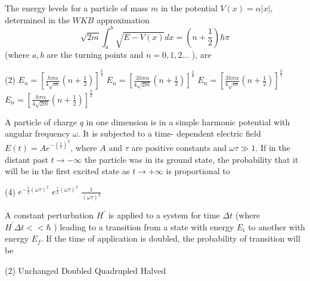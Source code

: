 \begin{enumerate}
\begin{minipage}{\textwidth}
	\item The energy levels for a particle of mass $m$ in the potential $V(x)=\alpha|x|$, determined in the $W K B$ approximation
	$$
	\sqrt{2 m} \int_{a}^{b} \sqrt{E-V(x)} d x=\left(n+\frac{1}{2}\right) \hbar \pi
	$$
	(where $a, b$ are the turning points and $n=0,1,2 \ldots$ ), are
\end{minipage}
\begin{tasks}(2)
	\task[\textbf{A.}] $E_{n}=\left[\frac{h \pi \alpha}{4 \sqrt{m}}\left(n+\frac{1}{2}\right)\right]^{\frac{2}{3}}$
	\task[\textbf{B.}]$E_{n}=\left[\frac{3 h \pi \alpha}{4 \sqrt{2 m}}\left(n+\frac{1}{2}\right)\right]^{\frac{2}{3}}$
	\task[\textbf{C.}]$E_{n}=\left[\frac{3 h \pi \alpha}{4 \sqrt{m}}\left(n+\frac{1}{2}\right)\right]^{\frac{2}{3}}$
	\task[\textbf{D.}] $E_{n}=\left[\frac{h \pi \alpha}{4 \sqrt{2 m}}\left(n+\frac{1}{2}\right)\right]^{\frac{2}{3}}$
\end{tasks}
\begin{minipage}{\textwidth}
	\item A particle of charge $q$ in one dimension is in a simple harmonic potential with angular frequency $\omega$. It is subjected to a time- dependent electric field $E(t)=A e^{-\left(\frac{t}{\tau}\right)^{2}}$, where $A$ and $\tau$ are positive constants and $\omega \tau \gg 1$. If in the distant past $t \rightarrow-\infty$ the particle was in its ground state, the probability that it will be in the first excited state as $t \rightarrow+\infty$ is proportional to
\end{minipage}
\begin{tasks}(4)
	\task[\textbf{A.}] $e^{-\frac{1}{2}(\omega \tau)^{2}}$
	\task[\textbf{B.}]$e^{\frac{1}{2}(\omega \tau)^{2}}$
	\task[\textbf{D.}]$\frac{1}{(\omega \tau)^{2}}$
\end{tasks}
\begin{minipage}{\textwidth}
	\item A constant perturbation $H^{\prime}$ is applied to a system for time $\Delta t$ (where $H^{\prime} \Delta t<<\hbar$ ) leading to a transition from a state with energy $E_{i}$ to another with energy $E_{f}$. If the time of application is doubled, the probability of transition will be
\end{minipage}
\begin{tasks}(2)
	\task[\textbf{A.}] Unchanged
	\task[\textbf{B.}]Doubled
	\task[\textbf{C.}]Quadrupled
	\task[\textbf{D.}]Halved
\end{tasks}

\end{enumerate}
